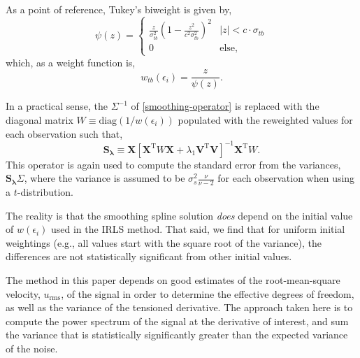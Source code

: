 \documentclass{ametsoc}
\begin{document}
As a point of reference, Tukey's biweight is given by,
\begin{equation}
\label{tukey-biweight}
\psi(z) = 
\begin{cases}
\frac{z}{\sigma_{tb}^2} \left(1-\frac{z^2}{c^2 \sigma_{tb}^2} \right)^2 & |z| < c \cdot \sigma_{tb} \\
0 & \textrm{else},
\end{cases}
\end{equation}
which, as a weight function is,
\begin{equation}
    w_{tb}(\epsilon_i) = \frac{z}{\psi(z)}.
\end{equation}

In a practical sense, the $\Sigma^{-1}$ of \eqref{smoothing-operator} is replaced with the diagonal matrix $W\equiv\textrm{diag}(1/w(\epsilon_i))$ populated with the reweighted values for each observation such that,
\begin{equation}
\label{general-smoothing-operator}
\mathbf{S_\lambda} \equiv \mathbf{X} \left[ \mathbf{X}^{\textrm{T}} W \mathbf{X} + \lambda_1 \mathbf{V}^{\textrm{T}} \mathbf{V} \right]^{-1} \mathbf{X}^{\textrm{T}} W.
\end{equation}
This operator is again used to compute the standard error from the variances,  $\mathbf{S_\lambda} \Sigma$, where the variance is assumed to be $\sigma_s^2 \frac{\nu}{\nu-2}$ for each observation when using a $t$-distribution.

The reality is that the smoothing spline solution \emph{does} depend on the initial value of $w(\epsilon_i)$ used in the IRLS method. That said, we find that for uniform initial weightings (e.g., all values start with the square root of the variance), the differences are not statistically significant from other initial values.

\appendix[C]
\label{sec:variance_estimate}

The method in this paper depends on good estimates of the root-mean-square velocity, $u_{\textrm{rms}}$, of the signal in order to determine the effective degrees of freedom, as well as the variance of the tensioned derivative. The approach taken here is to compute the power spectrum of the signal at the derivative of interest, and sum the variance that is statistically significantly greater than the expected variance of the noise.
\end{document}
